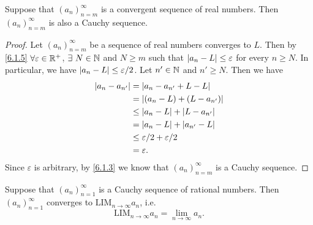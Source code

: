 \begin{prop}\label{6.1.12}
  Suppose that \((a_n)_{n = m}^\infty\) is a convergent sequence of real numbers.
  Then \((a_n)_{n = m}^\infty\) is also a Cauchy sequence.
\end{prop}

\begin{proof}
  Let \((a_n)_{n = m}^\infty\) be a sequence of real numbers converges to \(L\).
  Then by \cref{6.1.5} \(\forall \varepsilon \in \mathbb{R}^+\), \(\exists\ N \in \mathbb{N}\) and \(N \geq m\) such that \(\left\lvert a_n - L\right\rvert \leq \varepsilon\) for every \(n \geq N\).
  In particular, we have \(\left\lvert a_n - L\right\rvert \leq \varepsilon / 2\).
  Let \(n' \in \mathbb{N}\) and \(n' \geq N\).
  Then we have
  \begin{align*}
    \left\lvert a_n - a_{n'}\right\rvert & = \left\lvert a_n - a_{n'} + L - L\right\rvert           \\
                       & = \left\lvert(a_n - L) + (L - a_{n'})\right\rvert       \\
                       & \leq \left\lvert a_n - L\right\rvert + \left\lvert L - a_{n'}\right\rvert  \\
                       & = \left\lvert a_n - L\right\rvert + \left\lvert a_{n'} - L\right\rvert     \\
                       & \leq \varepsilon / 2 + \varepsilon / 2 \\
                       & = \varepsilon.
  \end{align*}
  Since \(\varepsilon\) is arbitrary, by \cref{6.1.3} we know that \((a_n)_{n = m}^\infty\) is a Cauchy sequence.
\end{proof}

\setcounter{thm}{14}
\begin{prop}\label{6.1.15}
  Suppose that \((a_n)_{n = 1}^\infty\) is a Cauchy sequence of rational numbers.
  Then \((a_n)_{n = 1}^\infty\) converges to \(\text{LIM}_{n \to \infty} a_n\), i.e.
  \[
    \text{LIM}_{n \to \infty} a_n = \lim_{n \to \infty} a_n.
  \]
\end{prop}

